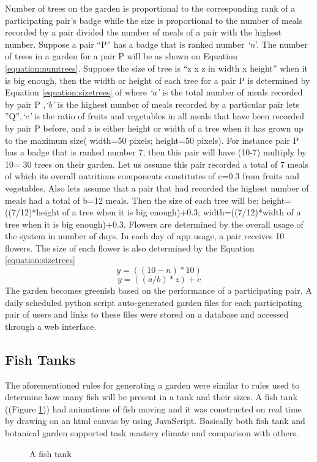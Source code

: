 \documentclass{sig-alternate}
\begin{document}
Number of trees on the garden is proportional to the corresponding rank of a participating pair's badge while the size is proportional to the number of meals recorded by a pair divided the number of meals of a pair with the highest number. Suppose a pair ``P'' has a badge that is ranked number \emph{`n'}.  The number of trees in a garden for a pair P will be as shown on Equation \ref{equation:numtrees}. Suppose the size of tree is ``z x z in width x height'' when it is big enough, then the width or height of each tree for a pair P is determined by Equation \ref{equation:sizetrees} of where \emph{`a'} is the total number of meals recorded by pair P ,\emph{`b'} is the highest number of meals recorded by a particular pair lets ''Q'',\emph{`c'} is the ratio of fruits and vegetables in all meals that have been recorded by pair P before, and z is either height or width of a tree when it has grown up to the maximum size( width=50 pixels; height=50 pixels).   For instance pair P has a badge that is ranked number 7, then this pair will have (10-7) multiply by 10= 30 trees on their garden. Let us assume this pair recorded a total of 7 meals of which its overall nutritions components constitutes of c=0.3 from fruits and vegetables. Also lets assume that a pair that had recorded the highest number of meals had a total of b=12 meals. Then the size of each tree will be; height=((7/12)*height of a tree when it is big enough)+0.3; width=((7/12)*width of a tree when it is big enough)+0.3.  Flowers are determined by the overall usage of the system in number of days. In each day of app usage, a pair receives 10 flowers. The size of each flower is also determined by the Equation \ref{equation:sizetrees}
\begin{equation}
\label{equation:numtrees}
y=((10-n)*10) 
\end{equation}
\begin{equation}
\label{equation:sizetrees}
y=((a/b)*z)+c 
\end{equation}
The garden becomes greenish based on the performance of a participating pair. A daily scheduled python script auto-generated garden files for each participating pair of users and links to these files were stored on a database and accessed through a web interface.
\subsection*{\textbf{Fish Tanks}}
The aforementioned rules for generating a garden were similar to rules used to determine how many fish will be present in a tank and their sizes. A fish tank ((Figure \ref{figure:tank})) had animations of fish moving and it was constructed on real time by drawing on an html canvas by using JavaScript. Basically both fish tank and botanical garden supported task mastery climate and comparison with others.
\begin{figure}[H]
\centering
{}
\caption{A fish tank}
\label{figure:tank}
\end{figure}
\end{document}
